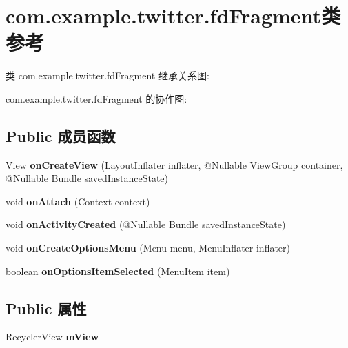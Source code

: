 \hypertarget{classcom_1_1example_1_1twitter_1_1fd_fragment}{}\section{com.\+example.\+twitter.\+fd\+Fragment类 参考}
\label{classcom_1_1example_1_1twitter_1_1fd_fragment}


类 com.\+example.\+twitter.\+fd\+Fragment 继承关系图\+:


com.\+example.\+twitter.\+fd\+Fragment 的协作图\+:
\subsection*{Public 成员函数}
\begin{DoxyCompactItemize}
\item 
\mbox{\label{classcom_1_1example_1_1twitter_1_1fd_fragment_af98296f35da922cbc0e5b0064e868346}} 
View {\bfseries on\+Create\+View} (Layout\+Inflater inflater, @Nullable View\+Group container, @Nullable Bundle saved\+Instance\+State)
\item 
\mbox{\label{classcom_1_1example_1_1twitter_1_1fd_fragment_ab20a1861b37aa916cfe34c66366edbb9}} 
void {\bfseries on\+Attach} (Context context)
\item 
\mbox{\label{classcom_1_1example_1_1twitter_1_1fd_fragment_a9bf5024a78738411b4ad0cd8b449cd74}} 
void {\bfseries on\+Activity\+Created} (@Nullable Bundle saved\+Instance\+State)
\item 
\mbox{\label{classcom_1_1example_1_1twitter_1_1fd_fragment_a6b834434e61442ba8c3f5b2f4a2a73f7}} 
void {\bfseries on\+Create\+Options\+Menu} (Menu menu, Menu\+Inflater inflater)
\item 
\mbox{\label{classcom_1_1example_1_1twitter_1_1fd_fragment_a55600e9303a7687c118b79318dedd527}} 
boolean {\bfseries on\+Options\+Item\+Selected} (Menu\+Item item)
\end{DoxyCompactItemize}
\subsection*{Public 属性}
\begin{DoxyCompactItemize}
\item 
\mbox{\label{classcom_1_1example_1_1twitter_1_1fd_fragment_aaa9356c1a5b2951e09ae96adac645b87}} 
Recycler\+View {\bfseries m\+View}
\end{DoxyCompactItemize}
